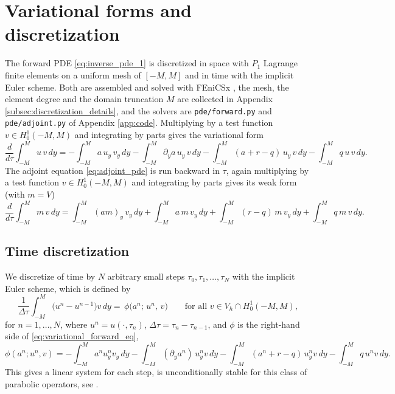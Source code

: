 \section{Variational forms and discretization}\label{sec:variational_forms}

The forward PDE \eqref{eq:inverse_pde_1} is discretized in space with
$P_1$ Lagrange finite elements on a uniform mesh of $[-M, M]$ and in time with the
implicit Euler scheme.
Both are assembled and solved with FEniCSx \cite{fenicsx},
the mesh, the element degree and the domain truncation $M$ are collected in
Appendix \ref{subsec:discretization_details},
and the solvers are \texttt{pde/forward.py} and \texttt{pde/adjoint.py} of Appendix \ref{app:code}.
Multiplying by a test function $v \in H^1_0(-M,M)$ and integrating by parts gives the variational form
\begin{equation}\label{eq:variational_forward_eq}
    \frac{d}{d\tau}\int_{-M}^{M} u\,v\,dy
    = -\int_{-M}^{M} a\,u_y\,v_y\,dy
      -\int_{-M}^{M}\partial_y a\,u_y\,v\,dy
      -\int_{-M}^{M}(a + r - q)\,u_y\,v\,dy
      -\int_{-M}^{M} q\,u\,v\,dy.
\end{equation}
The adjoint equation \eqref{eq:adjoint_pde} is run backward in $\tau$,
again multiplying by a test function $v \in H^1_0(-M,M)$ and integrating by parts gives its weak form (with $m = V$)
\begin{equation}\label{eq:variational_adjoint_eq}
    \frac{d}{d\tau}\int_{-M}^{M} m\,v\,dy
    = \int_{-M}^{M}(am)_y\,v_y\,dy
      +\int_{-M}^{M} a\,m\,v_y\,dy
      +\int_{-M}^{M}(r-q)\,m\,v_y\,dy
      +\int_{-M}^{M} q\,m\,v\,dy.
\end{equation}

\subsection{Time discretization}

We discretize of time by $N$ arbitrary small steps $\tau_0, \tau_1, \ldots, \tau_N$ with the implicit Euler scheme,
which is defined by
\begin{equation}\label{eq:backward_euler}
    \frac{1}{\Delta\tau}\int_{-M}^{M}\bigl(u^n - u^{n-1}\bigr)v\,dy
    = \,\phi\bigl(a^n;\,u^n,\,v\bigr)
    \qquad\text{for all } v \in V_h \cap H^1_0(-M,M),
\end{equation}
for $n = 1,\dots,N$, where $u^n = u(\cdot,\tau_n)$, $\Delta\tau = \tau_n - \tau_{n-1}$,
and $\phi$ is the right-hand side of \eqref{eq:variational_forward_eq},
\begin{equation*}
    \phi(a^n; u^n, v)
    = -\int_{-M}^{M}\!\! a^n u^n_y v_y\,dy
      -\int_{-M}^{M}\!\! (\partial_y a^n)\,u^n_y v\,dy
      -\int_{-M}^{M}\!\! (a^n + r - q)\,u^n_y v\,dy
      -\int_{-M}^{M}\!\! q\,u^n v\,dy.
\end{equation*}
This gives a linear system for each step,
is unconditionally stable for this class of parabolic operators, see \cite{thomee_galerkin}.

